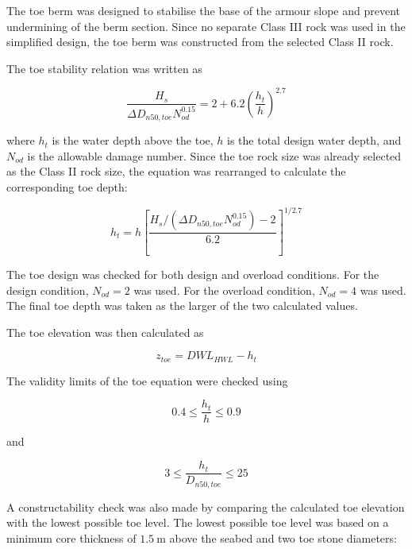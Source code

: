 \documentclass[a4paper, 11pt]{article}
\begin{document}
\hspace*{0.5cm} The toe berm was designed to stabilise the base of the armour slope and prevent undermining of the berm section. Since no separate Class III rock was used in the simplified design, the toe berm was constructed from the selected Class II rock.

The toe stability relation was written as

\begin{equation}
    \frac{H_s}{\Delta D_{n50,toe}N_{od}^{0.15}}
    =
    2+6.2\left(\frac{h_t}{h}\right)^{2.7}
    \label{eq:berm_toe}
\end{equation}

where \(h_t\) is the water depth above the toe, \(h\) is the total design water depth, and \(N_{od}\) is the allowable damage number. Since the toe rock size was already selected as the Class II rock size, the equation was rearranged to calculate the corresponding toe depth:

\begin{equation}
    h_t
    =
    h\left[
    \frac{
    H_s/(\Delta D_{n50,toe}N_{od}^{0.15})-2
    }{6.2}
    \right]^{1/2.7}
    \label{eq:berm_ht}
\end{equation}

The toe design was checked for both design and overload conditions. For the design condition, \(N_{od}=2\) was used. For the overload condition, \(N_{od}=4\) was used. The final toe depth was taken as the larger of the two calculated values.

The toe elevation was then calculated as

\begin{equation}
    z_{toe}=DWL_{HWL}-h_t
    \label{eq:berm_toe_elev}
\end{equation}

The validity limits of the toe equation were checked using

\begin{equation}
    0.4\leq\frac{h_t}{h}\leq0.9
\end{equation}

and

\begin{equation}
    3\leq\frac{h_t}{D_{n50,toe}}\leq25
\end{equation}

A constructability check was also made by comparing the calculated toe elevation with the lowest possible toe level. The lowest possible toe level was based on a minimum core thickness of \(1.5~\mathrm{m}\) above the seabed and two toe stone diameters:
\end{document}
